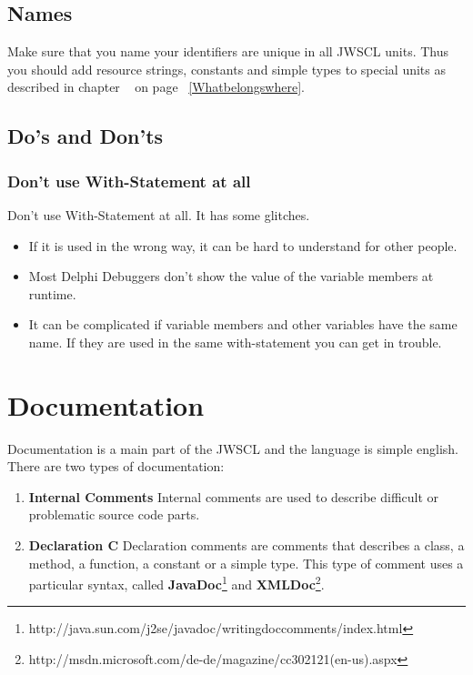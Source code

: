 \documentclass[a4paper,oneside,10pt]{article}
\begin{document}
\subsection{Names}
Make sure that you name your identifiers are unique in all JWSCL units. Thus you should add resource strings, constants and simple types to special units as described in chapter ~\pageref{Whatbelongswhere} on page ~\ref{Whatbelongswhere}.

\subsection{Do's and Don'ts}

\subsubsection{Don't use With-Statement at all}
Don't use With-Statement at all. It has some glitches.

\begin{itemize}
  \item If it is used in the wrong way, it can be hard to understand for other people.
  \item Most Delphi Debuggers don't show the value of the variable members at runtime.
  \item It can be complicated if variable members and other variables have the same name. If they are used in the same with-statement you can get in trouble.
\end{itemize}



\section{Documentation}
Documentation is a main part of the JWSCL and the language is simple english. There are two types of documentation:
\begin{enumerate}
	\item \textbf{Internal Comments} Internal comments are used to describe difficult or problematic source code parts. 

	\item \textbf{Declaration C} Declaration comments are comments that describes a class, a method, a function, a constant or a simple type. This type of comment uses a particular syntax, called \textbf{JavaDoc}\footnote{http://java.sun.com/j2se/javadoc/writingdoccomments/index.html} and \textbf{XMLDoc}\footnote{http://msdn.microsoft.com/de-de/magazine/cc302121(en-us).aspx}.
\end{enumerate}
\end{document}
